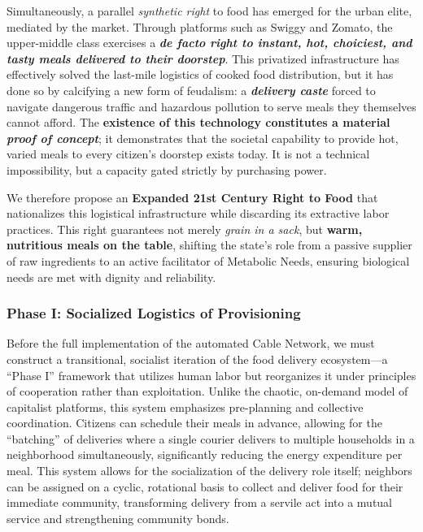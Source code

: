 Simultaneously, a parallel \emph{synthetic right} to food has emerged
for the urban elite, mediated by the market. Through platforms such as
Swiggy and Zomato, the upper-middle class exercises a \textbf{\emph{de
facto right to instant, hot, choiciest, and tasty meals delivered to
their doorstep}}. This privatized infrastructure has effectively solved
the last-mile logistics of cooked food distribution, but it has done so
by calcifying a new form of feudalism: a \textbf{\emph{delivery caste}}
forced to navigate dangerous traffic and hazardous pollution to serve
meals they themselves cannot afford. The \textbf{existence of this
technology constitutes a material \emph{proof of concept}}; it
demonstrates that the societal capability to provide hot, varied meals
to every citizen's doorstep exists today. It is not a technical
impossibility, but a capacity gated strictly by purchasing power.

We therefore propose an \textbf{Expanded 21st Century Right to Food}
that nationalizes this logistical infrastructure while discarding its
extractive labor practices. This right guarantees not merely \emph{grain
in a sack}, but \textbf{warm, nutritious meals on the table}, shifting
the state's role from a passive supplier of raw ingredients to an active
facilitator of Metabolic Needs, ensuring biological needs are met with
dignity and reliability.

\subsubsection{Phase I: Socialized Logistics of
Provisioning}\label{phase-i-socialized-logistics-of-provisioning}

Before the full implementation of the automated Cable Network, we must
construct a transitional, socialist iteration of the food delivery
ecosystem---a ``Phase I'' framework that utilizes human labor but
reorganizes it under principles of cooperation rather than exploitation.
Unlike the chaotic, on-demand model of capitalist platforms, this system
emphasizes pre-planning and collective coordination. Citizens can
schedule their meals in advance, allowing for the ``batching'' of
deliveries where a single courier delivers to multiple households in a
neighborhood simultaneously, significantly reducing the energy
expenditure per meal. This system allows for the socialization of the
delivery role itself; neighbors can be assigned on a cyclic, rotational
basis to collect and deliver food for their immediate community,
transforming delivery from a servile act into a mutual service and
strengthening community bonds.

